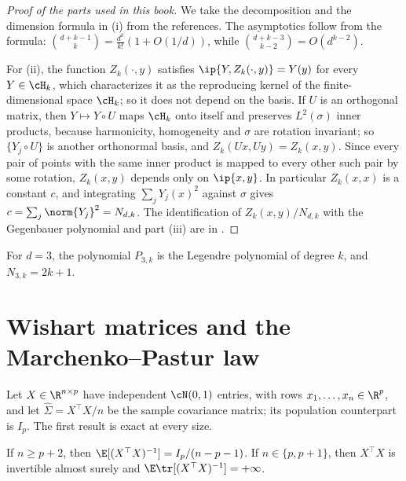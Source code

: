 \begin{refsection}
\begin{proof}[Proof of the parts used in this book]
We take the decomposition and the dimension formula in (i) from the references. The asymptotics follow from the formula: $\binom{d+k-1}k=\frac{d^k}{k!}(1+O(1/d))$, while $\binom{d+k-3}{k-2}=O(d^{k-2})$.

For (ii), the function $Z_k(\cdot,y)$ satisfies $\ip{Y,Z_k(\cdot,y)}=Y(y)$ for every $Y\in\cH_k$, which characterizes it as the reproducing kernel of the finite-dimensional space $\cH_k$; so it does not depend on the basis. If $U$ is an orthogonal matrix, then $Y\mapsto Y\circ U$ maps $\cH_k$ onto itself and preserves $L^2(\sigma)$ inner products, because harmonicity, homogeneity and $\sigma$ are rotation invariant; so $\{Y_j\circ U\}$ is another orthonormal basis, and $Z_k(Ux,Uy)=Z_k(x,y)$. Since every pair of points with the same inner product is mapped to every other such pair by some rotation, $Z_k(x,y)$ depends only on $\ip{x,y}$. In particular $Z_k(x,x)$ is a constant $c$, and integrating $\sum_jY_j(x)^2$ against $\sigma$ gives $c=\sum_j\norm{Y_j}^2=N_{d,k}$. The identification of $Z_k(x,y)/N_{d,k}$ with the Gegenbauer polynomial and part (iii) are in \textcite[Chapter~IV]{SteinWeiss1971}.
\end{proof}

For $d=3$, the polynomial $P_{3,k}$ is the Legendre polynomial of degree $k$, and $N_{3,k}=2k+1$.

\section{Wishart matrices and the Marchenko--Pastur law}\label{sec:toolkit:mp}

Let $X\in\R^{n\times p}$ have independent $\cN(0,1)$ entries, with rows $x_1,\dots,x_n\in\R^p$, and let $\hat\Sigma=X^\top X/n$ be the sample covariance matrix; its population counterpart is $I_p$. The first result is exact at every size.

\begin{theorem}\label{thm:toolkit:inv-wishart}
If $n\ge p+2$, then $\E[(X^\top X)^{-1}]=I_p/(n-p-1)$. If $n\in\{p,p+1\}$, then $X^\top X$ is invertible almost surely and $\E\tr[(X^\top X)^{-1}]=+\infty$.
\end{theorem}


\end{refsection}
